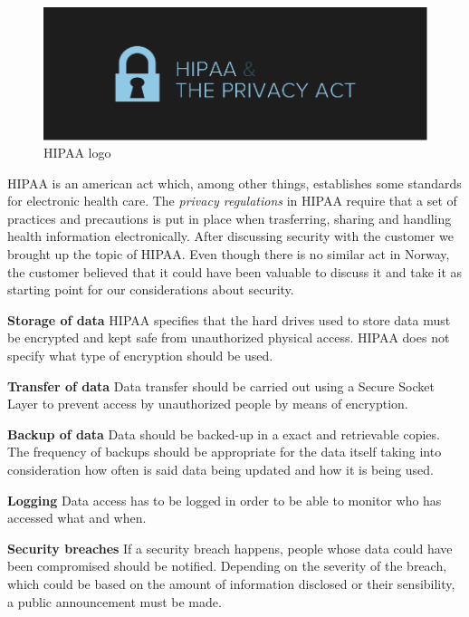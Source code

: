 \begin{figure}[h]
\centering
\includegraphics[scale=0.50]{../Figures/hipaa2.png}
\caption{HIPAA logo}
\label{figure:HIPAA}
\end{figure}

HIPAA\cite{HIPAA} is an american act which, among other things, establishes some standards
for electronic health care. The \textit{privacy regulations} in HIPAA require
that a set of practices and precautions is put in place when trasferring, sharing
and handling health information electronically.
After discussing security with the customer we brought up the topic of HIPAA.
Even though there is no similar act in Norway, the customer believed that it could have been
valuable to discuss it and take it as starting point for our considerations about security. 

\textbf{Storage of data}\newline
HIPAA specifies that the hard drives used to store data must be encrypted and
kept safe from unauthorized physical access. HIPAA does not specify what type
of encryption should be used.

\textbf{Transfer of data}\newline
Data transfer should be carried out using a Secure Socket Layer\cite{SSL}
to prevent access by unauthorized people by means of encryption.

\textbf{Backup of data}\newline
Data should be backed-up in a exact and retrievable copies.
The frequency of backups should be appropriate for the data itself
taking into consideration how often is said data being updated and how it is being
used.

\textbf{Logging}\newline
Data access has to be logged in order to be able to monitor who
has accessed what and when.

\textbf{Security breaches}\newline
If a security breach happens, people whose data could have been compromised
should be notified. Depending on the severity of the breach, which could be
based on the amount of information disclosed or their sensibility,
a public announcement must be made.

